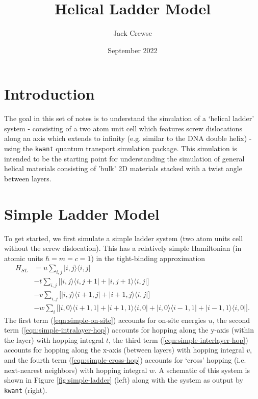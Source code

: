 \documentclass{article}
\title{Helical Ladder Model}
\author{Jack Crewse}
\date{September 2022}
\newcommand{\bra}[1]{\langle#1|}
\newcommand{\ket}[1]{|#1\rangle}
\begin{document}
\maketitle

\section{Introduction}
The goal in this set of notes is to understand the simulation of a `helical ladder' system - consisting of a two atom unit cell which features screw dislocations along an axis which extends to infinity (e.g. similar to the DNA double helix) - using the \verb|kwant| quantum transport simulation package. This simulation is intended to be the starting point for understanding the simulation of general helical materials consisting of 'bulk' 2D materials stacked with a twist angle between layers. 

\section{Simple Ladder Model}
To get started, we first simulate a simple ladder system (two atom units cell without the screw dislocation). This has a relatively simple Hamiltonian (in atomic units $\hbar = m = c = 1$) in the tight-binding approximation
\begin{align}
    H_{SL} & = u\sum_{i,j} \ket{i,j}\bra{i,j} \label{eqn:simple-on-site} \\
       &- t\sum_{i,j} \big[\ket{i,j}\bra{i,j+1} + \ket{i,j+1}\bra{i,j}\big] \label{eqn:simple-intralayer-hop} \\
       &- v\sum_{i,j} \big[\ket{i,j}\bra{i+1,j} + \ket{i+1,j}\bra{i,j}\big] \label{eqn:simple-interlayer-hop} \\
       &- w\sum_{i} \big[\ket{i,0}\bra{i+1,1} + \ket{i+1,1}\bra{i,0} + \ket{i,0}\bra{i-1,1} + \ket{i-1,1}\bra{i,0}\big] \label{eqn:simple-cross-hop}.
\end{align}
The first term (\ref{eqn:simple-on-site}) accounts for on-site energies $u$, the second term (\ref{eqn:simple-intralayer-hop}) accounts for hopping along the y-axis (within the layer) with hopping integral $t$, the third term (\ref{eqn:simple-interlayer-hop}) accounts for hopping along the x-axis (between layers) with hopping integral $v$, and the fourth term (\ref{eqn:simple-cross-hop}) accounts for `cross' hopping (i.e. next-nearest neighbors) with hopping integral $w$. A schematic of this system is shown in Figure \ref{fig:simple-ladder} (left) along with the system as output by \verb|kwant| (right).
\end{document}
